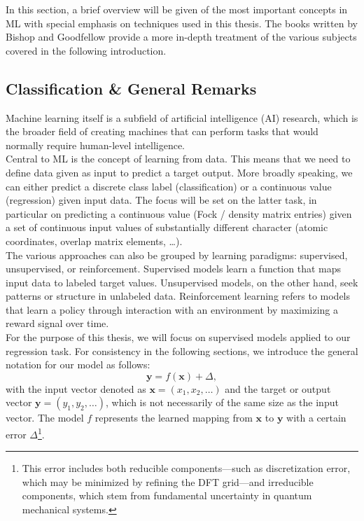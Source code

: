 In this section, a brief overview will be given of the most important concepts in ML with special emphasis on techniques used in this thesis. The books written by Bishop \parencite{ref:bishop2006pattern} and Goodfellow \parencite{ref:goodfellow2016deep} provide a more in-depth treatment of the various subjects covered in the following introduction.
\subsection{Classification \& General Remarks}
\label{subsec:background_ml_general_concepts}
Machine learning itself is a subfield of artificial intelligence (AI) research, which is the broader field of creating machines that can perform tasks that would normally require human-level intelligence. \\
Central to ML is the concept of learning from data. This means that we need to define data given as input to predict a target output. More broadly speaking, we can either predict a discrete class label (classification) or a continuous value (regression) given input data. The focus will be set on the latter task, in particular on predicting a continuous value (Fock / density matrix entries) given a set of continuous input values of substantially different character (atomic coordinates, overlap matrix elements, \dots). \\
The various approaches can also be grouped by learning paradigms: supervised, unsupervised, or reinforcement. Supervised models learn a function that maps input data to labeled target values. Unsupervised models, on the other hand, seek patterns or structure in unlabeled data. Reinforcement learning refers to models that learn a policy through interaction with an environment by maximizing a reward signal over time.\\

For the purpose of this thesis, we will focus on supervised models applied to our regression task. For consistency in the following sections, we introduce the general notation for our model as follows:
\begin{equation}
    \label{eq:general_ML_model_formula}
    \mathbf{y} = f(\mathbf{x}) + \Delta,
\end{equation}
with the input vector denoted as $\mathbf{x} = (x_1, x_2, \dots)$ and the target or output vector $\mathbf{y} = (y_1, y_2, \dots)$, which is not necessarily of the same size as the input vector. The model $f$ represents the learned mapping from $\mathbf{x}$ to $\mathbf{y}$ with a certain 
error $\Delta$\footnote{This error includes both reducible components—such as discretization error, which may be minimized by refining the DFT grid—and irreducible components, which stem from fundamental uncertainty in quantum mechanical systems.}. 

